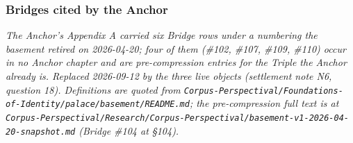 \documentclass[11pt, openany]{book}
\begin{document}
\subsubsection*{Bridges cited by the Anchor}

\textit{The Anchor's Appendix A carried six Bridge rows under a numbering the basement retired on 2026-04-20; four of them (\#102, \#107, \#109, \#110) occur in no Anchor chapter and are pre-compression entries for the Triple the Anchor already is. Replaced 2026-09-12 by the three live objects (settlement note N6, question 18). Definitions are quoted from \texttt{Corpus-Perspectival/Foundations-of-Identity/palace/basement/README.md}; the pre-compression full text is at \texttt{Corpus-Perspectival/Research/Corpus-Perspectival/basement-v1-2026-04-20-snapshot.md} (Bridge \#104 at §104).}
\end{document}

